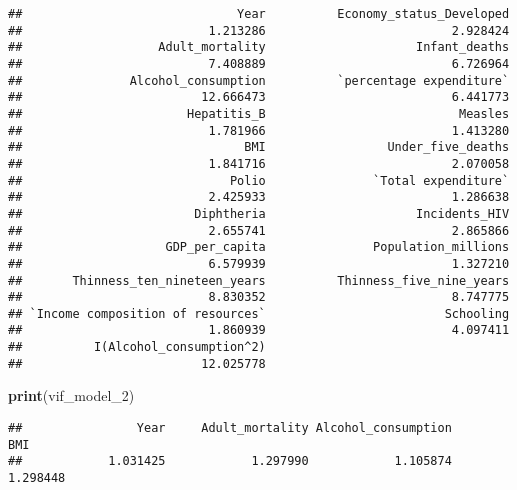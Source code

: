 \documentclass[
]{article}
\newenvironment{Shaded}{\begin{snugshade}}{\end{snugshade}}
\newcommand{\AttributeTok}[1]{\textcolor[rgb]{0.13,0.29,0.53}{#1}}
\newcommand{\CommentTok}[1]{\textcolor[rgb]{0.56,0.35,0.01}{\textit{#1}}}
\newcommand{\DecValTok}[1]{\textcolor[rgb]{0.00,0.00,0.81}{#1}}
\newcommand{\FunctionTok}[1]{\textcolor[rgb]{0.13,0.29,0.53}{\textbf{#1}}}
\newcommand{\NormalTok}[1]{#1}
\newcommand{\OtherTok}[1]{\textcolor[rgb]{0.56,0.35,0.01}{#1}}
\newcommand{\SpecialCharTok}[1]{\textcolor[rgb]{0.81,0.36,0.00}{\textbf{#1}}}
\newcommand{\StringTok}[1]{\textcolor[rgb]{0.31,0.60,0.02}{#1}}
\begin{document}
\begin{verbatim}
##                              Year          Economy_status_Developed 
##                          1.213286                          2.928424 
##                   Adult_mortality                     Infant_deaths 
##                          7.408889                          6.726964 
##               Alcohol_consumption          `percentage expenditure` 
##                         12.666473                          6.441773 
##                       Hepatitis_B                           Measles 
##                          1.781966                          1.413280 
##                               BMI                 Under_five_deaths 
##                          1.841716                          2.070058 
##                             Polio               `Total expenditure` 
##                          2.425933                          1.286638 
##                        Diphtheria                     Incidents_HIV 
##                          2.655741                          2.865866 
##                    GDP_per_capita               Population_millions 
##                          6.579939                          1.327210 
##       Thinness_ten_nineteen_years          Thinness_five_nine_years 
##                          8.830352                          8.747775 
## `Income composition of resources`                         Schooling 
##                          1.860939                          4.097411 
##          I(Alcohol_consumption^2) 
##                         12.025778
\end{verbatim}

\begin{Shaded}
\begin{Highlighting}[]
\FunctionTok{print}\NormalTok{(vif\_model\_2)}
\end{Highlighting}
\end{Shaded}

\begin{verbatim}
##                Year     Adult_mortality Alcohol_consumption                 BMI 
##            1.031425            1.297990            1.105874            1.298448
\end{verbatim}

\begin{Shaded}
\end{Shaded}
\end{document}
